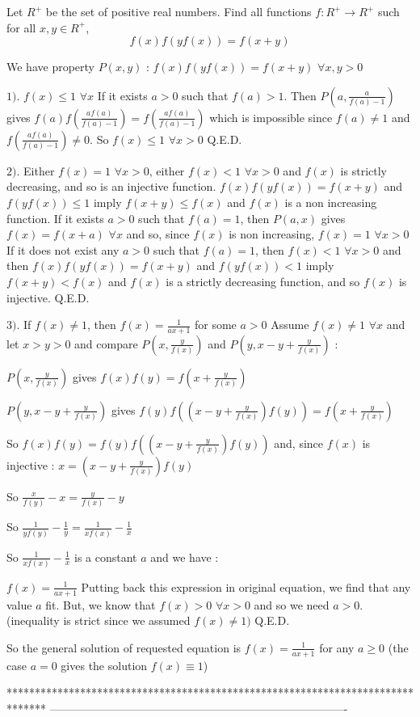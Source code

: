 \begin{mysolution}
	\begin{tcolorbox}Let $ R^{+}$ be the set of positive real numbers. Find all functions $ f: R^{+}\rightarrow R^{+}$ such for all $ x,y \in R^{+}$,
\[ f(x)f(yf(x))=f(x+y) \]
\end{tcolorbox}

We have property $ P(x,y)$ : $ f(x)f(yf(x))=f(x+y)$ $ \forall x,y>0$

$ 1).$ $ f(x)\leq 1$ $ \forall x$
If it exists $ a>0$ such that $ f(a)>1$. 
Then $ P(a,\frac{a}{f(a)-1})$ gives $ f(a)f(\frac{af(a)}{f(a)-1})=f(\frac{af(a)}{f(a)-1})$ which is impossible since $ f(a)\neq 1$ and $ f(\frac{af(a)}{f(a)-1})\neq 0$. So $ f(x)\leq 1$ $ \forall x>0$
Q.E.D.

$ 2).$ Either $ f(x)=1$ $ \forall x>0$, either $ f(x)<1$ $ \forall x>0$ and $ f(x)$ is strictly decreasing, and so is an injective function.
$ f(x)f(yf(x))=f(x+y)$ and $ f(yf(x))\leq 1$ imply $ f(x+y)\leq f(x)$ and $ f(x)$ is a non increasing function.
If it exists $ a>0$ such that $ f(a)=1$, then $ P(a,x)$ gives $ f(x)=f(x+a)$ $ \forall x$ and so, since $ f(x)$ is non increasing, $ f(x)=1$ $ \forall x>0$
If it does not exist any $ a>0$ such that $ f(a)=1$, then $ f(x)<1$ $ \forall x>0$ and then $ f(x)f(yf(x))=f(x+y)$ and $ f(yf(x))< 1$ imply $ f(x+y)< f(x)$ and $ f(x)$ is a strictly decreasing function, and so $ f(x)$ is injective.
Q.E.D.

$ 3).$ If $ f(x)\neq 1$, then $ f(x)=\frac{1}{ax+1}$ for some $ a>0$
Assume $ f(x)\neq 1$ $ \forall x$ and let $ x>y>0$ and compare $ P(x,\frac{y}{f(x)})$ and $ P(y,x-y+\frac{y}{f(x)})$ :

$ P(x,\frac{y}{f(x)})$ gives $ f(x)f(y)=f(x+\frac{y}{f(x)})$

$ P(y,x-y+\frac{y}{f(x)})$ gives $ f(y)f((x-y+\frac{y}{f(x)})f(y))=f(x+\frac{y}{f(x)})$

So $ f(x)f(y)=f(y)f((x-y+\frac{y}{f(x)})f(y))$ and, since $ f(x)$ is injective : $ x=(x-y+\frac{y}{f(x)})f(y)$

So  $ \frac{x}{f(y)}-x=\frac{y}{f(x)}-y$

So $ \frac{1}{yf(y)}-\frac{1}{y}=\frac{1}{xf(x)}-\frac{1}{x}$

So $ \frac{1}{xf(x)}-\frac{1}{x}$ is a constant $ a$ and we have :

$ f(x)=\frac{1}{ax+1}$
Putting back this expression in original equation, we find that any value $ a$ fit. But, we know that $ f(x)>0$ $ \forall x>0$ and so we need $ a>0$. (inequality is strict since we assumed $ f(x)\neq 1)$
Q.E.D.


So the general solution of requested equation is $ f(x)=\frac{1}{ax+1}$ for any $ a\geq 0$ (the case $ a=0$ gives the solution $ f(x)\equiv 1$)
\end{mysolution}
*******************************************************************************
-------------------------------------------------------------------------------

